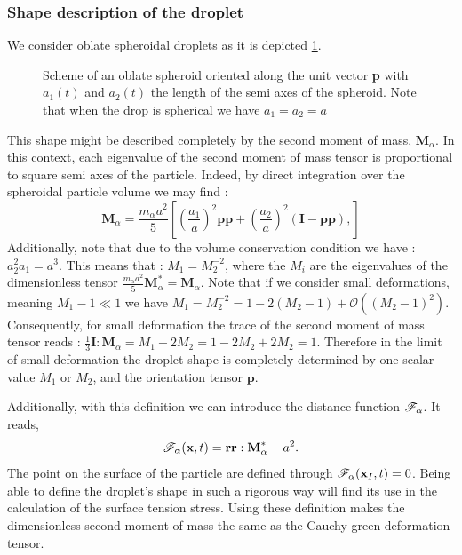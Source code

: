 \subsubsection*{Shape description of the droplet}
We consider oblate spheroidal droplets as it is depicted \ref{fig:scheme_spheroid}. 
\begin{figure}[h!]
    \centering
    \hfill
    \hfill
    \caption{Scheme of an  oblate spheroid oriented along the unit vector \textbf{p} with $a_1(t)$ and $a_2(t)$ the length of the semi axes of the spheroid.
    Note that when the drop is spherical we have $a_1=a_2=a$}
    \label{fig:scheme_spheroid}
\end{figure}
This shape might be described completely by the second moment of mass, $\textbf{M}_\alpha$.
In this context, each eigenvalue of the second moment of mass tensor is proportional to square semi axes of the particle. 
Indeed, by direct integration over the spheroidal particle volume we may find :
\begin{equation*}
    \textbf{M}_\alpha
    = \frac{m_\alpha a^2}{5}\left[
        \left(\frac{a_1}{a}\right)^2\textbf{pp}
        + \left(\frac{a_2}{a}\right)^2 (\textbf{I} - \textbf{pp}),
    \right] 
\end{equation*}
Additionally, note that due to the volume conservation condition we have : $ a_2^2 a_1 = a^3$. 
This means that : $M_1 = M_2^{-2}$, where the $M_i$ are the eigenvalues of the dimensionless tensor $\frac{m_\alpha a^2}{5}\textbf{M}_\alpha^* = \textbf{M}_\alpha$. 
Note that if we consider small deformations, meaning $M_1 - 1 \ll 1$ we have $M_1  = M_2^{-2} = 1 - 2 (M_2 - 1) + \mathcal{O}((M_2 -1)^2)$. 
Consequently, for small deformation the trace of the second moment of mass tensor reads :  $\frac{1}{3}\textbf{I}:\textbf{M}_\alpha = M_1 + 2M_2 = 1 - 2M_2 + 2M_2 = 1$. 
Therefore in the limit of small deformation the droplet shape is completely determined by one scalar value $M_1$ or $M_2$, and the orientation tensor $\textbf{p}$. 

Additionally, with this definition we can introduce the distance function  $\mathscr{F}_\alpha$. 
It reads, 
\begin{equation*}
    \mathscr{F}_\alpha(\textbf{x},t) = \textbf{rr}:\textbf{M}_\alpha^* -a^2.  
    \label{eq:distance_function}
\end{equation*}
The point on the surface of the particle are defined through $\mathscr{F}_\alpha(\textbf{x}_I,t) = 0$. 
Being able to define the droplet's shape in such a rigorous way will find its use in the calculation of the surface tension stress. 
Using these definition makes the dimensionless  second moment of mass the same as the Cauchy green deformation tensor. 

